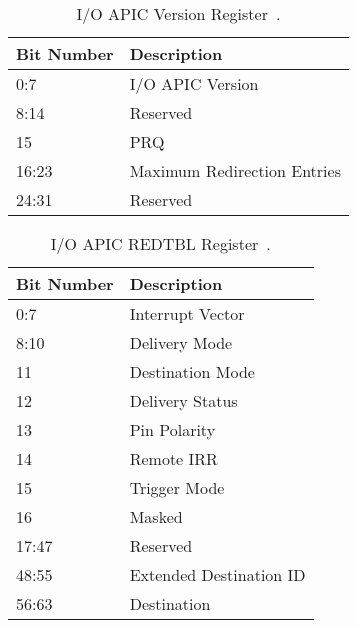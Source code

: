 \begin{table}[H]
  \centering
  \begin{tabularx}{1.0\textwidth}{| X | X |}
    \hline
    \textbf{Bit Number} & \textbf{Description}        \\ \hline\hline
    0:7                 & I/O APIC Version            \\ \hline
    8:14                & Reserved                    \\ \hline
    15                  & PRQ                         \\ \hline
    16:23               & Maximum Redirection Entries \\ \hline
    24:31               & Reserved                    \\ \hline
  \end{tabularx}
  \caption{I/O APIC Version Register~\autocite[sec.~9.5.7]{ich5}.}
  \label{tab:ioapicregsver}
\end{table}

\begin{table}[H]
  \centering
  \begin{tabularx}{1.0\textwidth}{| X | X |}
    \hline
    \textbf{Bit Number} & \textbf{Description}    \\ \hline\hline
    0:7                 & Interrupt Vector        \\ \hline
    8:10                & Delivery Mode           \\ \hline
    11                  & Destination Mode        \\ \hline
    12                  & Delivery Status         \\ \hline
    13                  & Pin Polarity            \\ \hline
    14                  & Remote IRR              \\ \hline
    15                  & Trigger Mode            \\ \hline
    16                  & Masked                  \\ \hline
    17:47               & Reserved                \\ \hline
    48:55               & Extended Destination ID \\ \hline
    56:63               & Destination             \\ \hline
  \end{tabularx}
  \caption{I/O APIC REDTBL Register~\autocite[sec.~9.5.8]{ich5}.}
  \label{tab:ioapicregsredtbl}
\end{table}

